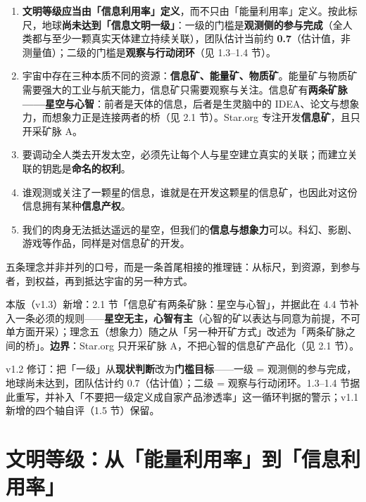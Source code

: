 \documentclass[11pt,fontset=none]{ctexart}
\begin{document}
\begin{enumerate}
  \item \textbf{文明等级应当由「信息利用率」定义}，而不只由「能量利用率」定义。按此标尺，地球\textbf{尚未达到「信息文明一级」}：一级的门槛是\textbf{观测侧的参与完成}（全人类都与至少一颗真实天体建立持续关联），团队估计当前约 \textbf{0.7}（估计值，非测量值）；二级的门槛是\textbf{观察与行动闭环}（见 1.3--1.4 节）。
  \item 宇宙中存在三种本质不同的资源：\textbf{信息矿、能量矿、物质矿}。能量矿与物质矿需要强大的工业与航天能力，信息矿只需要观察与关注。信息矿有\textbf{两条矿脉——星空与心智}：前者是天体的信息，后者是生灵脑中的 IDEA、论文与想象力，而想象力正是连接两者的桥（见 2.1 节）。Star.org 专注开发\textbf{信息矿}，且只开采矿脉 A。
  \item 要调动全人类去开发太空，必须先让每个人与星空建立真实的关联；而建立关联的钥匙是\textbf{命名的权利}。
  \item 谁观测或关注了一颗星的信息，谁就是在开发这颗星的信息矿，也因此对这份信息拥有某种\textbf{信息产权}。
  \item 我们的肉身无法抵达遥远的星空，但我们的\textbf{信息与想象力}可以。科幻、影剧、游戏等作品，同样是对信息矿的开发。
\end{enumerate}

五条理念并非并列的口号，而是一条首尾相接的推理链：从标尺，到资源，到参与者，到权益，再到抵达宇宙的另一种方式。

\vspace{4mm}

{\small\color{inkfaint}本版（v1.3）新增：2.1 节「信息矿有两条矿脉：星空与心智」，并据此在 4.4 节补入一条必须的规则——\textbf{星空无主，心智有主}（心智的矿以表达与同意为前提，不可单方面开采）；理念五（想象力）随之从「另一种开矿方式」改述为「两条矿脉之间的桥」。\textbf{边界}：Star.org 只开采矿脉 A，不把心智的信息矿产品化（见 2.1 节）。\par}

{\small\color{inkfaint}v1.2 修订：把「一级」从\textbf{现状判断}改为\textbf{门槛目标}——一级 = 观测侧的参与完成，地球尚未达到，团队估计约 0.7（估计值）；二级 = 观察与行动闭环。1.3--1.4 节据此重写，并补入「不要把一级定义成自家产品渗透率」这一循环判据的警示；v1.1 新增的四个轴自评（1.5 节）保留。\par}

\newpage

\section{文明等级：从「能量利用率」到「信息利用率」}
\end{document}
